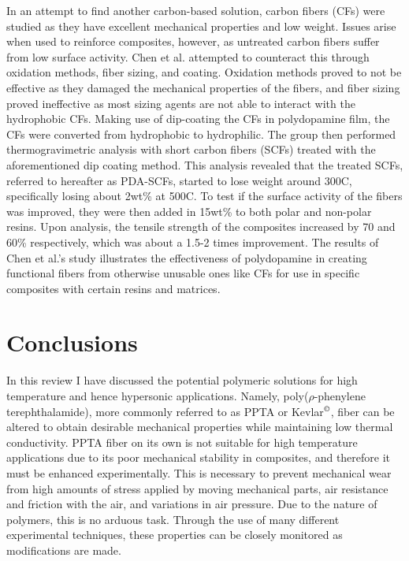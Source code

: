 \documentclass[12pt]{article}
\begin{document}
\begin{multicols}{2}
\indent In an attempt to find another carbon-based solution, carbon fibers (CFs) were studied as they have excellent mechanical properties and low weight. Issues arise when used to reinforce composites, however, as untreated carbon fibers suffer from low surface activity. Chen et al. \citep{ShushengChen2014} attempted to counteract this through oxidation methods, fiber sizing, and coating. Oxidation methods proved to not be effective as they damaged the mechanical properties of the fibers, and fiber sizing proved ineffective as most sizing agents are not able to interact with the hydrophobic CFs. Making use of dip-coating the CFs in polydopamine film, the CFs were converted from hydrophobic to hydrophilic. \citep{ShushengChen2014} The group then performed thermogravimetric analysis with short carbon fibers (SCFs) treated with the aforementioned dip coating method. This analysis revealed that the treated SCFs, referred to hereafter as PDA-SCFs, started to lose weight around 300\degree C, specifically losing about 2wt\% at 500\degree C. \citep{ShushengChen2014} To test if the surface activity of the fibers was improved, they were then added in 15wt\% to both polar and non-polar resins. Upon analysis, the tensile strength of the composites increased by 70 and 60\% respectively, which was about a 1.5-2 times improvement. \citep{ShushengChen2014} The results of Chen et al.'s \citep{ShushengChen2014} study illustrates the effectiveness of polydopamine in creating functional fibers from otherwise unusable ones like CFs for use in specific composites with certain resins and matrices. 

\section{Conclusions}

\indent In this review I have discussed the potential polymeric solutions for high temperature and hence hypersonic applications. Namely, poly($\rho$-phenylene terephthalamide), more commonly referred to as PPTA or Kevlar$^{\text{\textcopyright}}$, fiber can be altered to obtain desirable mechanical properties while maintaining low thermal conductivity. \citep{LiTong2022} PPTA fiber on its own is not suitable for high temperature applications due to its poor mechanical stability in composites, and therefore it must be enhanced experimentally. This is necessary to prevent mechanical wear from high amounts of stress applied by moving mechanical parts, air resistance and friction with the air, and variations in air pressure. Due to the nature of polymers, this is no arduous task. Through the use of many different experimental techniques, these properties can be closely monitored as modifications are made. 


\end{multicols}
\end{document}
